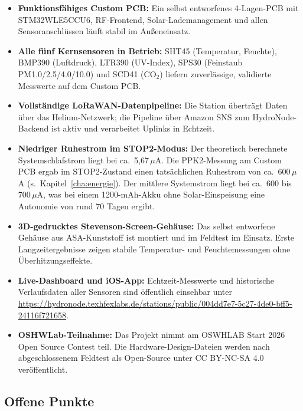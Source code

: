 \begin{itemize}
  \item \textbf{Funktionsfähiges Custom PCB:} Ein selbst entworfenes 4-Lagen-PCB mit STM32WLE5CCU6, RF-Frontend, Solar-Lademanagement und allen Sensoranschlüssen läuft stabil im Außeneinsatz.

  \item \textbf{Alle fünf Kernsensoren in Betrieb:} SHT45 (Temperatur, Feuchte), BMP390 (Luftdruck), LTR390 (UV-Index), SPS30 (Feinstaub PM1.0/2.5/4.0/10.0) und SCD41 (CO${}_2$) liefern zuverlässige, validierte Messwerte auf dem Custom PCB.

  \item \textbf{Vollständige LoRaWAN-Datenpipeline:} Die Station überträgt Daten über das Helium-Netzwerk; die Pipeline über Amazon SNS zum HydroNode-Backend ist aktiv und verarbeitet Uplinks in Echtzeit.

  \item \textbf{Niedriger Ruhestrom im STOP2-Modus:} Der theoretisch berechnete Systemschlafstrom liegt bei ca.\ 5,67\,$\mu$A. Die PPK2-Messung am Custom PCB ergab im STOP2-Zustand einen tatsächlichen Ruhestrom von ca.\ 600\,$\mu$A (s.\ Kapitel~\ref{cha:energie}). Der mittlere Systemstrom liegt bei ca.\ 600 bis 700\,$\mu$A, was bei einem 1200-mAh-Akku ohne Solar-Einspeisung eine Autonomie von rund 70 Tagen ergibt.

  \item \textbf{3D-gedrucktes Stevenson-Screen-Gehäuse:} Das selbst entworfene Gehäuse aus ASA-Kunststoff ist montiert und im Feldtest im Einsatz. Erste Langzeitergebnisse zeigen stabile Temperatur- und Feuchtemessungen ohne Überhitzungseffekte.

  \item \textbf{Live-Dashboard und iOS-App:} Echtzeit-Messwerte und historische Verlaufsdaten aller Sensoren sind öffentlich einsehbar unter \url{https://hydronode.texhfexlabs.de/stations/public/004dd7e7-5c27-4de0-bff5-24116f721658}.

  \item \textbf{OSHWLab-Teilnahme:} Das Projekt nimmt am OSWHLAB Start 2026 Open Source Contest teil. Die Hardware-Design-Dateien werden nach abgeschlossenem Feldtest als Open-Source unter CC BY-NC-SA 4.0 veröffentlicht.
\end{itemize}

\subsection*{Offene Punkte}

